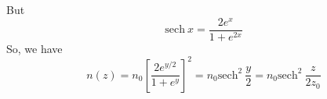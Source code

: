 \documentclass[]{article}
\begin{document}
\noindent
But
\begin{equation}
\mathrm{sech}~x= \frac{2e^x}{1+e^{2x}}
\end{equation}
\noindent
So, we have
\begin{equation}
n(z) = n_0 \left[\frac{2 e^{y/2}}{1+e^{y}}\right]^2 = n_0 \mathrm{sech}^{2}~\frac{y}{2} = n_0 \mathrm{sech}^2~\frac{z}{2 z_0}
\end{equation}
\end{document}
